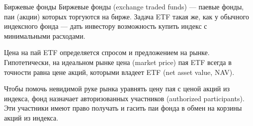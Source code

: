 \documentclass{beamer}
\begin{document}
\begin{frame}{Биржевые фонды}
\justify
Биржевые фонды (exchange traded funds) --- паевые фонды, паи (акции) которых торгуются на бирже. Задача ETF такая же, как у обычного индексного фонда --- дать инвестору возможность купить индекс с минимальными расходами.

\justify
Цена на пай ETF определяется спросом и предложением на рынке. Гипотетически, на идеальном рынке цена (market price) пая ETF всегда в точности равна цене акций, которыми владеет ETF (net asset value, NAV).

\justify
Чтобы помочь невидимой руке рынка уравнять цену пая с ценой акций из индекса, фонд назначает авторизованных участников (authorized participants). Эти участники имеют право получать и гасить паи фонда в обмен на корзины акций из индекса.
\end{frame}
\end{document}
